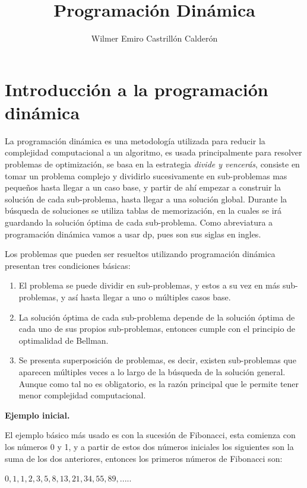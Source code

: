 \documentclass[12pt, a4paper]{article}
\title{\textbf{Programación Dinámica}}
\author{Wilmer Emiro Castrillón Calderón}
\newcommand{\subtitulo}[1]{\begin{center}\textbf{#1}\end{center}}
\begin{document}
	\maketitle
	
	\section{Introducción a la programación dinámica}
	
	La programación dinámica es una metodología utilizada para reducir la complejidad computacional a un
	algoritmo, es usada principalmente para resolver problemas de optimización,
	se basa en la estrategia \textit{divide y vencerás}, consiste en tomar un problema complejo y dividirlo 
	sucesivamente en sub-problemas mas pequeños hasta llegar a un caso base, y partir de ahí empezar a construir la
	solución de cada sub-problema, hasta llegar a una solución global. Durante la búsqueda de soluciones
	se utiliza tablas de memorización, en la cuales se irá guardando la solución óptima de cada sub-problema.
	Como abreviatura a programación dinámica vamos a usar dp, pues son sus siglas en ingles.
	
	Los problemas que pueden ser resueltos utilizando programación dinámica presentan tres condiciones básicas:
	\begin{enumerate}[1.]
		\item El problema se puede dividir en sub-problemas, y estos a su vez en más sub-problemas, y así hasta llegar
				a uno o múltiples casos base.
		\item La solución óptima de cada sub-problema depende de la solución óptima de cada uno de sus
				propios sub-problemas, entonces cumple con el principio de optimalidad de Bellman.
		\item Se presenta superposición de problemas, es decir, existen sub-problemas que aparecen múltiples veces
		 		a lo largo de la búsqueda de la solución general. Aunque como tal no es obligatorio, es la razón 
		 		principal que le permite tener menor complejidad computacional.
	\end{enumerate}
	
	\subtitulo{Ejemplo inicial.}
	
	El ejemplo básico más usado es con la sucesión de Fibonacci, esta comienza con los números 0 y 1, y a partir
	de estos dos números iniciales los siguientes son la suma de los dos anteriores, entonces los primeros
	números de Fibonacci son:
	\begin{center} $0, 1, 1, 2, 3, 5, 8, 13, 21, 34, 55, 89, ..... $ \end{center}
	
\end{document}
